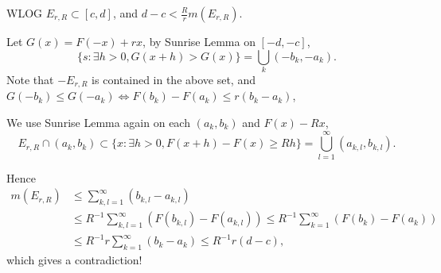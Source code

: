 WLOG $E_{r,R}\subset[c,d]$, and $d-c<\frac{R}{r}m(E_{r,R})$.

Let $G(x) = F(-x) + rx$, by Sunrise Lemma on $[-d,-c]$,
 \[
\{s: \exists h>0, G(x+h)>G(x)\} = \bigcup_k (-b_k, -a_k).
\]
Note that $-E_{r,R}$ is contained in the above set,
and $G(-b_k)\le G(-a_k)\iff F(b_k) - F(a_k)\le r(b_k - a_k)$,

We use Sunrise Lemma again on each $(a_k, b_k)$ and $F(x)-Rx$,
 \[
E_{r,R}\cap (a_k,b_k) \subset \{x: \exists h>0, F(x+h)-F(x)\ge Rh\}
= \bigcup_{l=1}^\infty (a_{k,l}, b_{k,l}).
\]

Hence
\begin{align*}
	m(E_{r,R}) &\le \sum_{k,l=1}^{\infty}(b_{k,l}-a_{k,l})\\
	&\le R^{-1} \sum_{k,l=1}^{\infty}(F(b_{k,l}) - F(a_{k,l}))
	\le R^{-1} \sum_{k=1}^{\infty}(F(b_k) - F(a_k))\\
	&\le R^{-1} r \sum_{k=1}^{\infty}(b_k - a_k) \le R^{-1}r (d-c),
\end{align*}
which gives a contradiction!
